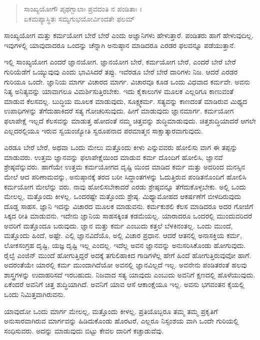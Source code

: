 \begin{verse}
ಸಾಂಖ್ಯಯೋಗೌ ಪೃಥಗ್ಬಾಲಾಃ ಪ್ರವದಂತಿ ನ ಪಂಡಿತಾಃ ।\\ಏಕಮಪ್ಯಾಸ್ಥಿತಃ ಸಮ್ಯಗುಭಯೋರ್ವಿಂದತೇ ಫಲಮ್ 
\end{verse}

{\small ಸಾಂಖ್ಯಯೋಗ ಮತ್ತು ಕರ್ಮಯೋಗ ಬೇರೆ ಬೇರೆ ಎಂದು ಅಜ್ಞಾನಿಗಳು ಹೇಳುತ್ತಾರೆ. ಪಂಡಿತರು ಹಾಗೆ ಹೇಳುವುದಿಲ್ಲ. ಇವುಗಳಲ್ಲಿ ಯಾವುದಾದರೂ ಒಂದನ್ನು ಚೆನ್ನಾಗಿ ಅನುಷ್ಠಾನ ಮಾಡಿದರೂ ಎರಡರ ಫಲವನ್ನೂ ಪಡೆಯುತ್ತಾನೆ.}

ಇಲ್ಲಿ ಸಾಂಖ್ಯಯೋಗ ಎಂದರೆ ಜ್ಞಾನಯೋಗ. ಜ್ಞಾನಯೋಗ ಬೇರೆ, ಕರ್ಮಯೋಗ ಬೇರೆ, ಎಂದರೆ ಬೇರೆ ಬೇರೆ ಗುರಿಯೆಡೆಗೆ ಒಯ್ಯುವುವು ಎಂದು ಭಾವಿಸಿದರೆ ತಪ್ಪು. ಇವೆರಡೂ ಬೇರೆ ಬೇರೆ ದಾರಿಗಳು ನಿಜ. ಆದರೆ ಎರಡರ ಗುರಿಯೂ ಒಂದೇ. ಜ್ಞಾನಿಯ ಮಾರ್ಗ ವಿಚಾರದ ಮಾರ್ಗ. ವಿಚಾರವೂ ಕೂಡ ಒಂದು ವಿಧವಾದ ಕರ್ಮವೇ. ಅವನು ನಿತ್ಯ ಅನಿತ್ಯವನ್ನು ಯಾವಾಗಲೂ ವಿಮರ್ಶಿಸುತ್ತಿರಬೇಕು. ಇದು ಕೈಕಾಲುಗಳ ಮೂಲಕ ಎಲ್ಲರಿಗೂ ಕಾಣುವಂತೆ ಮಾಡುವ ಕೆಲಸವಲ್ಲ. ಬುದ್ಧಿಯ ಮೂಲಕ ಮಾಡುವುದು, ಸೂಕ್ಷ್ಮಕರ್ಮ. ಸತ್ಯವನ್ನು ಕಾಣದಂತೆ ಮಾಡಿರುವ ಮಿಥ್ಯದ ಉಪಾಧಿಗಳನ್ನು ತೆಗೆದುಹಾಕಿದರೆ ಸತ್ಯ ಗೋಚರಿಸುವುದು. ಹೀಗೆ ಮಾಡುವುದು ಜ್ಞಾನಮಾರ್ಗ. ಕರ್ಮಯೋಗ ಫಲಾಪೇಕ್ಷೆ ಇಲ್ಲದೆ ಕೆಲಸವನ್ನು ಮಾಡುತ್ತ ಹೋದಂತೆ ನಮ್ಮ ಚಿತ್ತವನ್ನು ಶುದ್ಧಿಮಾಡುವುದು. ಚಿತ್ತಶುದ್ಧಿಯಾದರೆ ಆಗಲೇ ಎಲ್ಲದರಲ್ಲಿಯೂ ಇರುವ ಸ್ವಯಂಜ್ಯೋತಿ ಸ್ವರೂಪನಾದ ಪರಮಾತ್ಮನ ಸಾಕ್ಷಾತ್ಕಾರವಾಗುವುದು.

ಎರಡೂ ಬೇರೆ ಬೇರೆ, ಅಥವಾ ಒಂದು ಮೇಲು ಮತ್ತೊಂದು ಕೀಳು ಎನ್ನುವವರು ಹೋಲಿಸು ವಾಗ ಈ ತಪ್ಪನ್ನು ಮಾಡುವರು. ಉತ್ತಮ ಜ್ಞಾನವನ್ನು ಫಲಾಪೇಕ್ಷೆಯಿಂದ ಮಾಡುವ ಕರ್ಮ ದೊಂದಿಗೆ ಹೋಲಿಸಿ, ಜ್ಞಾನವೆ ಶ್ರೇಷ್ಠವೆನ್ನುವರು. ಹಾಗೆಯೇ ಉತ್ತಮ ಕರ್ಮಯೋಗದ ದೃಷ್ಟಿ ಯಿಂದ ಮಾಡಿದ ಕರ್ಮ ಮತ್ತು ಅದರಿಂದ ಮನಸ್ಸಿನ ಮೇಲೆ ಆದ ಪರಿಣಾಮವನ್ನು, ಅನುಷ್ಠಾನಕ್ಕೆ ತರದ ಬರೀ ಸಿದ್ಧಾಂತಗಳನ್ನು ಓದುತ್ತಿರುವ ಪಂಡಿತನೊಂದಿಗೆ ಹೋಲಿಸಿ ಕರ್ಮಯೋಗ ಮೇಲೆನ್ನು ವರು. ನಾವು ಹೋಲಿಸಬೇಕಾದರೆ ಎರಡು ಶ್ರೇಷ್ಠವನ್ನೂ ತೆಗೆದುಕೊಳ್ಳಬೇಕು. ಅಲ್ಲಿ ಒಂದು ಮೇಲಲ್ಲ, ಮತ್ತೊಂದು ಕೀಳಲ್ಲ. ಒಂದರಷ್ಟೇ ಮತ್ತೊಂದು ಶ್ರೇಷ್ಠ. ಮಿಥ್ಯಾಮೋಹದ ಆಕರ್ಷಣೆಗೆ ಬೀಳದಿರುವುದು ದೊಡ್ಡ ಸಾಹಸ. ಜ್ಞಾನಿ ಇದನ್ನು ವಿಚಾರದ ಮೂಲಕ ಮಾಡುವನು. ಕರ್ಮಕುಶಲಿ ಕೆಲಸ ಮಾಡಿದರೂ ಅದರ ಗೋಜಿಗೆ ಸಿಕ್ಕದ ರೀತಿ ಮಾಡುವನು. ಇದೇನು ಜ್ಞಾನಿಯ ಸಾಹಸಕ್ಕಿಂತ ಕಡಮೆಯಲ್ಲ. ಯಾರಾದರೂ ಒಂದರಲ್ಲಿ ಮುಂದುವರಿದರೆ ಅವರಿಗೆ ಮತ್ತೊಂದೂ ಬರುವುದು. ಜ್ಞಾನ ಮತ್ತು ಕರ್ಮ ಎಂಬುದು ಕತ್ತಲೆ ಬೆಳಕಿನಂತಲ್ಲ. ಒಂದು ಮುಂದೆ, ಮತ್ತೊಂದು ಹಿಂದೆ, ಅಷ್ಟೇ. ಎಲ್ಲಿ ಜ್ಞಾನವಿದೆಯೊ, ಅಲ್ಲಿ ವಿಚಾರ ಪ್ರಧಾನ. ಆದರೆ ಆತನಲ್ಲಿ ಅನಾಸಕ್ತಿಯ ಕರ್ಮ, ಲೋಕಸಂಗ್ರಹ ದೃಷ್ಟಿ, ಯಜ್ಞ ದೃಷ್ಟಿ ಇಲ್ಲ ಎಂದಲ್ಲ. ಇದೆಲ್ಲ ಅವನ ಜ್ಞಾನವನ್ನು ಅನುಸರಿಸಿಕೊಂಡು ಹೋಗುವುದು. ರೈಲ್ವೆ ಎಂಜಿನ್ ಮುಂದೆ ಹೋಗುತ್ತಿದ್ದರೆ ಅದಕ್ಕೆ ತಗುಲಿಹಾಕಿದ ಗಾಡಿಗಳೆಲ್ಲ ಹೇಗೆ ಹಿಂದೆ ಹೋಗುತ್ತಿರುವುವೋ ಹಾಗೆ. ಅದರಂತೆಯೇ ಯಾರಲ್ಲಿ ಕರ್ಮ ಮುಂದಾಗಿದೆಯೋ ಅವನಲ್ಲಿ ಜ್ಞಾನವಿಲ್ಲದೆ ಇಲ್ಲ. ಅವನೇನು ಪಂಡಿತರಂತೆ ಹಲವು ಶಾಸ್ತ್ರಗಳನ್ನು ಉದಾಹರಿಸದೆ ಇರಬಹುದು. ನಿಜವಾದ ಸತ್ಯ ಯಾವುದು ಎಂಬುದು ಅವನಿಗೆ ಕ್ಷಣದಲ್ಲಿ ಹೊಳೆಯುವುದು. ಏಕೆಂದರೆ ಅವನಿಗೆ ಚಿತ್ತ ಶುದ್ಧಿಯಾಗಿದೆ. ಅವನಿಗೆ ಯಾವ ಆಸೆ ಆಕಾಂಕ್ಷೆಯೂ ಇಲ್ಲ. ಅವನು ಭಗವಂತನ ಕೈಯಲ್ಲಿ ಒಂದು ನಿಮಿತ್ತವಾಗಿರುವನು.

ಯಾವುದೋ ಒಂದು ಮಾರ್ಗ ಮೇಲಲ್ಲ, ಮತ್ತೊಂದು ಕೀಳಲ್ಲ. ಪ್ರತಿಯೊಬ್ಬರೂ ತಮ್ಮ ತಮ್ಮ ಪ್ರಕೃತಿಗೆ ಅನುಸಾರವಾಗಿರುವ ಮಾರ್ಗವನ್ನು ಹಿಡಿದುಕೊಂಡು ಹೊರಟರೆ, ಎಲ್ಲರೂ ನಿಸ್ಸಂಶಯ ವಾಗಿ ಒಂದೇ ಗುರಿಯಲ್ಲಿ ಸಂಧಿಸುವರು. ಅದನ್ನು ಮಾಡುವುದು ಬಿಟ್ಟು ಕೇವಲ ದಾರಿಗೆ ಕಚ್ಚಾಡುವೆವು.


